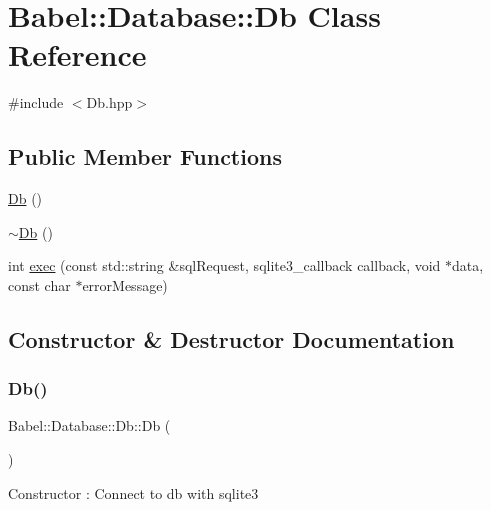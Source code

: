 \hypertarget{classBabel_1_1Database_1_1Db}{}\section{Babel\+:\+:Database\+:\+:Db Class Reference}
\label{classBabel_1_1Database_1_1Db}


{\ttfamily \#include $<$Db.\+hpp$>$}

\subsection*{Public Member Functions}
\begin{DoxyCompactItemize}
\item 
\hyperlink{classBabel_1_1Database_1_1Db_a636b51cded7df2a547cb3e92eae2c9aa}{Db} ()
\item 
\hyperlink{classBabel_1_1Database_1_1Db_ae2db80c6284b03521602816320afe0e2}{$\sim$\+Db} ()
\item 
int \hyperlink{classBabel_1_1Database_1_1Db_a303f2379d95fa3921a6c650fe304d9bd}{exec} (const std\+::string \&sql\+Request, sqlite3\+\_\+callback callback, void $\ast$data, const char $\ast$error\+Message)
\end{DoxyCompactItemize}


\subsection{Constructor \& Destructor Documentation}
\mbox{\label{classBabel_1_1Database_1_1Db_a636b51cded7df2a547cb3e92eae2c9aa}} 
\subsubsection{\texorpdfstring{Db()}{Db()}}
{\footnotesize\ttfamily Babel\+::\+Database\+::\+Db\+::\+Db (\begin{DoxyParamCaption}{ }\end{DoxyParamCaption})\hspace{0.3cm}{\ttfamily [inline]}}

Constructor \+: Connect to db with sqlite3 \mbox{\label{classBabel_1_1Database_1_1Db_ae2db80c6284b03521602816320afe0e2}} 
